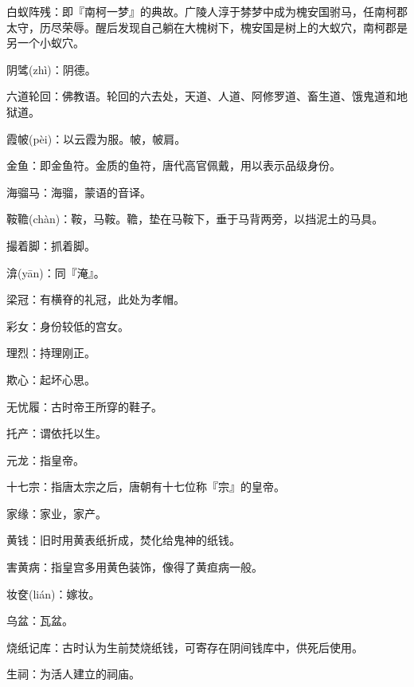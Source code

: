 \startbuffer[451]
白蚁阵残：即『南柯一梦』的典故。广陵人淳于棼梦中成为槐安国驸马，任南柯郡太守，历尽荣辱。醒后发现自己躺在大槐树下，槐安国是树上的大蚁穴，南柯郡是另一个小蚁穴。
\stopbuffer


\startbuffer[452]
阴骘(zhì)：阴德。
\stopbuffer


\startbuffer[453]
六道轮回：佛教语。轮回的六去处，天道、人道、阿修罗道、畜生道、饿鬼道和地狱道。
\stopbuffer


\startbuffer[454]
霞帔(pèi)：以云霞为服。帔，帔肩。
\stopbuffer


\startbuffer[455]
金鱼：即金鱼符。金质的鱼符，唐代高官佩戴，用以表示品级身份。
\stopbuffer


\startbuffer[456]
海骝马：海骝，蒙语的音译。
\stopbuffer


\startbuffer[457]
鞍韂(chàn)：鞍，马鞍。韂，垫在马鞍下，垂于马背两旁，以挡泥土的马具。
\stopbuffer


\startbuffer[458]
撮着脚：抓着脚。
\stopbuffer


\startbuffer[459]
渰(yān)：同『淹』。
\stopbuffer


\startbuffer[460]
梁冠：有横脊的礼冠，此处为孝帽。
\stopbuffer


\startbuffer[461]
彩女：身份较低的宫女。
\stopbuffer


\startbuffer[462]
理烈：持理刚正。
\stopbuffer


\startbuffer[463]
欺心：起坏心思。
\stopbuffer


\startbuffer[464]
无忧履：古时帝王所穿的鞋子。
\stopbuffer


\startbuffer[465]
托产：谓依托以生。
\stopbuffer


\startbuffer[466]
元龙：指皇帝。
\stopbuffer


\startbuffer[467]
十七宗：指唐太宗之后，唐朝有十七位称『宗』的皇帝。
\stopbuffer


\startbuffer[468]
家缘：家业，家产。
\stopbuffer


\startbuffer[469]
黄钱：旧时用黄表纸折成，焚化给鬼神的纸钱。
\stopbuffer


\startbuffer[470]
害黄病：指皇宫多用黄色装饰，像得了黄疸病一般。
\stopbuffer


\startbuffer[471]
妆奁(lián)：嫁妆。
\stopbuffer


\startbuffer[472]
乌盆：瓦盆。
\stopbuffer


\startbuffer[473]
烧纸记库：古时认为生前焚烧纸钱，可寄存在阴间钱库中，供死后使用。
\stopbuffer


\startbuffer[474]
生祠：为活人建立的祠庙。
\stopbuffer


